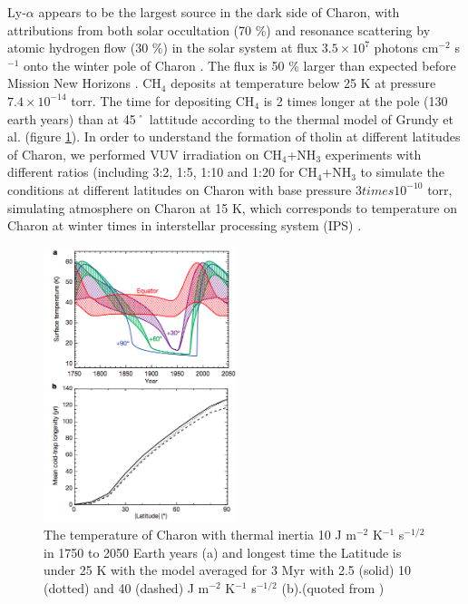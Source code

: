 Ly-$\alpha$ appears to be the largest source in the dark side of Charon, with attributions from both solar occultation (70 \%) and resonance scattering by atomic hydrogen flow (30 \%) in the solar system at flux $3.5 \times 10^7$ photons cm$^{-2}$ s$^{-1}$ onto the winter pole of Charon \cite{grundy2016formation}. The flux is 50 \% larger than expected before Mission New Horizons \cite{gladstone2015lyalpha}. CH$_4$ deposits at temperature below 25 K at pressure $7.4 \times 10^{-14}$ torr. The time for depositing CH$_4$ is 2 times longer at the pole (130 earth years) than at 45˚ lattitude according to the thermal model of Grundy et al. \cite{grundy2016formation} (figure \ref{fig:Charon_thermal}). In order to understand the formation of tholin at different latitudes of Charon, we performed VUV irradiation on CH$_4$+NH$_3$ experiments with different ratios (including 3:2, 1:5, 1:10 and 1:20 for CH$_4$+NH$_3$ to simulate the conditions at different latitudes on Charon with base pressure $3 times 10^{-10}$ torr, simulating atmosphere on Charon at 15 K, which corresponds to temperature on Charon at winter times \cite{grundy2016formation} in interstellar processing system (IPS) \cite{chen2013vacuum}.

\begin{figure}
\centering
\includegraphics[width=0.5\textwidth]{figures/chapter1/thermal.png}
\caption{The temperature of Charon with thermal inertia 10 J m$^{-2}$ K$^{-1}$ s$^{-1/2}$ in 1750 to 2050 Earth years (a) and longest time the Latitude is under 25 K with the model averaged for 3 Myr with 2.5 (solid) 10 (dotted) and 40 (dashed) J m$^{-2}$ K$^{-1}$ s$^{-1/2}$ (b).(quoted from \cite{grundy2016formation})}
\label{fig:Charon_thermal}
\end{figure}

